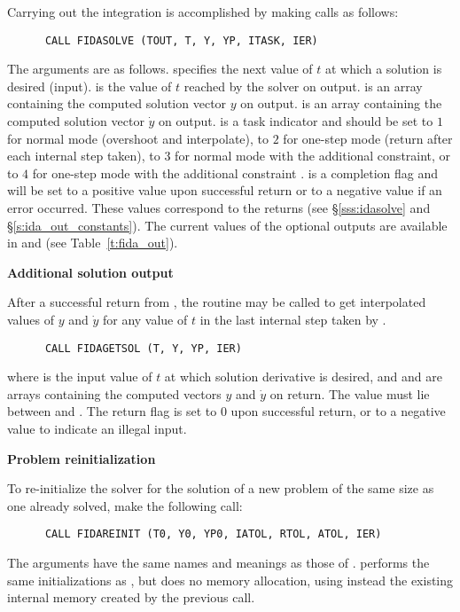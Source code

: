 \begin{Steps}
  Carrying out the integration is accomplished by making calls as follows:
\begin{verbatim}
      CALL FIDASOLVE (TOUT, T, Y, YP, ITASK, IER)
\end{verbatim}
  The arguments are as follows.
   specifies the next value of $t$ at which a solution is desired (input).
   is the value of $t$ reached by the solver on output.
   is an array containing the computed solution vector $y$ on output.
   is an array containing the computed solution vector $\dot{y}$ on output.
   is a task indicator and should be set to $1$ for normal mode 
  (overshoot  and interpolate), to $2$ for one-step mode 
  (return after each internal step taken), to $3$ for normal mode with
  the additional  constraint, or to $4$ for one-step mode 
  with the additional constraint .
   is a completion flag and will be set to a positive value upon
  successful return or to a negative value if an error occurred. These values
  correspond to the  returns (see \S\ref{sss:idasolve} and \S\ref{s:ida_out_constants}).
  The current values of the optional outputs are available in  and
   (see Table~\ref{t:fida_out}).
  
\item {\bf Additional solution output}

  After a successful return from , the routine  may
  be called to get interpolated values of $y$ and $\dot{y}$ for any value of $t$ in
  the last internal step taken by {\ida}.
\begin{verbatim}
      CALL FIDAGETSOL (T, Y, YP, IER)
\end{verbatim}
  where
   is the input value of $t$ at which solution derivative is desired, and
   and  are arrays containing the computed vectors $y$ and $\dot{y}$
  on return.  The value  must lie between  and .
  The return flag  is set to $0$ upon successful return, or to a
  negative value to indicate an illegal input.
  
\item {\bf Problem reinitialization}

  To re-initialize the {\ida} solver for the solution of a new problem
  of the same size as one already solved, make the following call:
\begin{verbatim}
      CALL FIDAREINIT (T0, Y0, YP0, IATOL, RTOL, ATOL, IER)
\end{verbatim}
  The arguments have the same names and meanings as those of .
   performs the same initializations as , but
  does no memory allocation, using instead the existing internal memory
  created by the previous  call.


\end{Steps}
